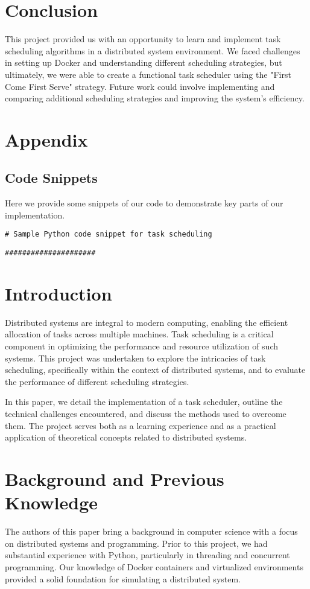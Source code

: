 \documentclass{article}
\begin{document}
\section{Conclusion}
This project provided us with an opportunity to learn and implement task scheduling algorithms in a distributed system environment. We faced challenges in setting up Docker and understanding different scheduling strategies, but ultimately, we were able to create a functional task scheduler using the "First Come First Serve" strategy. Future work could involve implementing and comparing additional scheduling strategies and improving the system's efficiency.

\section{Appendix}
\subsection{Code Snippets}
Here we provide some snippets of our code to demonstrate key parts of our implementation.

\begin{verbatim}
# Sample Python code snippet for task scheduling
\end{verbatim}

\begin{verbatim}
#####################
\end{verbatim}

\section{Introduction}
Distributed systems are integral to modern computing, enabling the efficient allocation of tasks across multiple machines. Task scheduling is a critical component in optimizing the performance and resource utilization of such systems. This project was undertaken to explore the intricacies of task scheduling, specifically within the context of distributed systems, and to evaluate the performance of different scheduling strategies.

In this paper, we detail the implementation of a task scheduler, outline the technical challenges encountered, and discuss the methods used to overcome them. The project serves both as a learning experience and as a practical application of theoretical concepts related to distributed systems.

\section{Background and Previous Knowledge}
The authors of this paper bring a background in computer science with a focus on distributed systems and programming. Prior to this project, we had substantial experience with Python, particularly in threading and concurrent programming. Our knowledge of Docker containers and virtualized environments provided a solid foundation for simulating a distributed system.
\end{document}
